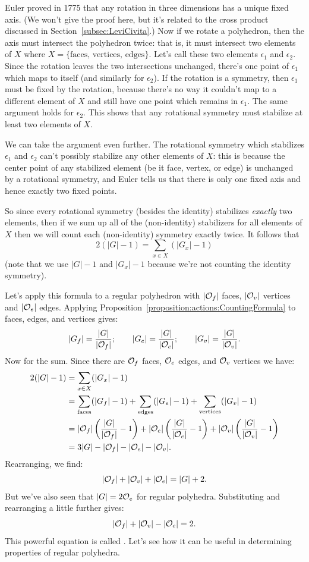 Euler proved in 1775 that any rotation in three dimensions has a unique fixed axis. (We won't give the proof here, but it's related to the cross product discussed in Section~\ref{subsec:LeviCivita}.)  Now if we  rotate a polyhedron, then the axis must intersect the polyhedron twice: that is, it must intersect two elements of $X$ where $X = \{\text{faces, vertices, edges}\}$. Let's call these two elements $\epsilon_1$ and $\epsilon_2$. Since the rotation leaves the two intersections unchanged, there's one point of $\epsilon_1$ which maps to itself (and similarly for $\epsilon_2$). If the rotation is a symmetry, then $\epsilon_1$ must be fixed by the rotation, because there's no way it couldn't map to a different element of $X$ and still have one point which remains in $\epsilon_1$. The same argument holds for $\epsilon_2$. This shows that any rotational symmetry must stabilize at least two elements of $X$. 

We can take the argument even further. The rotational symmetry which stabilizes $\epsilon_1$ and $\epsilon_2$ can't possibly stabilize any other elements of $X$: this is because the center point of any stabilized element (be it face, vertex, or edge) is unchanged by a rotational symmetry, and Euler tells us that there is only one fixed axis and hence exactly two fixed points.  

So since every rotational symmetry (besides the identity) stabilizes \emph{exactly} two elements, then if we sum up all of the (non-identity) stabilizers for all elements of $X$ then we will count each (non-identity) symmetry exactly twice. It follows that
\[ 2(|G|-1) = \sum_{x \in X}  (|G_x|-1) \]
(note that we use $|G|-1$ and $|G_x|-1$  because we're not counting the identity symmetry). 


Let's apply this formula to a regular polyhedron with $|{\cal O}_f|$ faces, $|{\cal O}_v|$ vertices and $|{\cal O}_e|$ edges.  Applying Proposition~\ref{proposition:actions:CountingFormula} to faces, edges, and vertices gives:
\[ |G_f|=\frac{|G|}{|{\cal O}_f|}; \qquad |G_e|=\frac{|G|}{|{\cal O}_e|}; \qquad |G_v|=\frac{|G|}{|{\cal O}_v|}.\]
Now for the sum.  Since there are ${\cal O}_f$ faces, ${\cal O}_e$ edges, and ${\cal O}_v$ vertices we have:
\begin{align*}
2 (|G| -1) &=  \sum_{x \in X}  (|G_x|-1)\\
&=  \sum_{\text{faces}}  (|G_f|-1)+\sum_{\text{edges}}  (|G_e|-1)+\sum_{\text{vertices}}  (|G_v|-1)\\
&= |{\cal O}_f|  \left(\frac{|G|}{|{\cal O}_f|}-1\right)+ |{\cal O}_e| \left(\frac{|G|}{|{\cal O}_e|}-1\right)+  |{\cal O}_v|\left(\frac{|G|}{|{\cal O}_v|}-1\right)\\
&=  3|G| - |{\cal O}_f| -  |{\cal O}_e| -  |{\cal O}_v|.
\end{align*}
Rearranging, we find:
\[ |{\cal O}_f| +  |{\cal O}_v|  +  |{\cal O}_e| =  |G|+2. \]
But we've also seen that $|G| = 2{\cal O}_e$ for regular polyhedra. Substituting and rearranging a little further gives:
\[ |{\cal O}_f|+|{\cal O}_v|-|{\cal O}_e|=2. \]
This powerful equation is called .  Let's see how it can be useful in determining properties of regular polyhedra.

